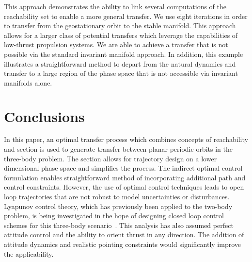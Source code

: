 \documentclass[preprint]{elsarticle}
\begin{document}
This approach demonstrates the ability to link several computations of the reachability set to enable a more general transfer.
We use eight iterations in order to transfer from the geostationary orbit to the stable manifold.
This approach allows for a larger class of potential transfers which leverage the capabilities of low-thrust propulsion systems.
We are able to achieve a transfer that is not possible via the standard invariant manifold approach. 
In addition, this example illustrates a straightforward method to depart from the natural dynamics and transfer to a large region of the phase space that is not accessible via invariant manifolds alone.

\section{Conclusions}\label{sec:conclusion}
In this paper, an optimal transfer process which combines concepts of reachability and \Poincare section is used to generate transfer between planar periodic orbits in the three-body problem.
The \Poincare section allows for trajectory design on a lower dimensional phase space and simplifies the process.
The indirect optimal control formulation enables straightforward method of incorporating additional path and control constraints.
However, the use of optimal control techniques leads to open loop trajectories that are not robust to model uncertainties or disturbances.
Lyapunov control theory, which has previously been applied to the two-body problem, is being investigated in the hope of designing closed loop control schemes for this three-body scenario~\cite{chang2002}.
This analysis has also assumed perfect attitude control and the ability to orient thrust in any direction.
The addition of attitude dynamics and realistic pointing constraints would significantly improve the applicability.

\appendix
\end{document}
